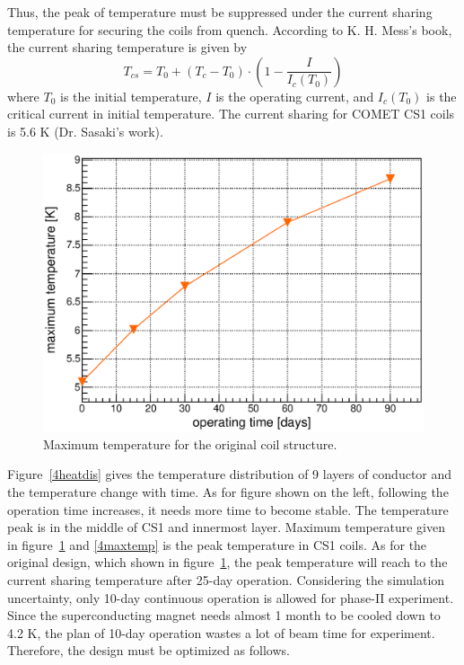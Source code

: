 Thus, the peak of temperature must be suppressed under the current sharing temperature for securing the coils from quench.
According to K. H. Mess's book, the current sharing temperature is given by
\begin{equation}
 T_{cs} = T_0 + (T_c - T_0)\cdot (1 - \frac{I}{I_c(T_0)})
\end{equation}
where $T_0$ is the initial temperature, $I$ is the operating current, and $I_c(T_0)$ is the critical current in initial temperature.
The current sharing for COMET CS1 coils is 5.6 K (Dr. Sasaki's work).
\begin{figure}[H]
 \centering
 \includegraphics[scale=0.43]{chapter5/fig/temp.eps}
 \caption{ Maximum temperature for the original coil structure.}
 \label{origin}
\end{figure}
Figure~\ref{4heatdis} gives the temperature distribution of 9 layers of conductor and the temperature change with time.
As for figure shown on the left, following the operation time increases, it needs more time to become stable.
The temperature peak is in the middle of CS1 and innermost layer.
Maximum temperature given in figure~\ref{origin} and \ref{4maxtemp} is the peak temperature in CS1 coils.
As for the original design, which shown in figure~\ref{origin}, the peak temperature will reach to the current sharing temperature after 25-day operation.
Considering the simulation uncertainty, only 10-day continuous operation is allowed for phase-II experiment.
Since the superconducting magnet needs almost 1 month to be cooled down to 4.2 K, the plan of 10-day operation wastes a lot of beam time for experiment.
Therefore, the design must be optimized as follows.
